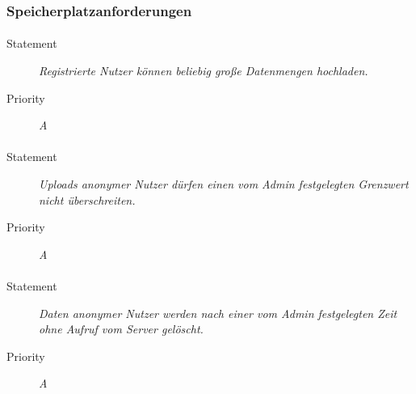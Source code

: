 \subsubsection{Speicherplatzanforderungen}

\paragraph{}
\begin{description}
\item[Statement] \textit{Registrierte Nutzer können beliebig große Datenmengen hochladen.}
\item[Priority] \textit{A}
\end{description}

\paragraph{}
\begin{description}
\item[Statement] \textit{Uploads anonymer Nutzer dürfen einen vom Admin festgelegten Grenzwert nicht überschreiten.}
\item[Priority] \textit{A}
\end{description}

\paragraph{}
\begin{description}
\item[Statement] \textit{Daten anonymer Nutzer werden nach einer vom Admin festgelegten Zeit ohne Aufruf vom Server gelöscht.}
\item[Priority] \textit{A}
\end{description}
